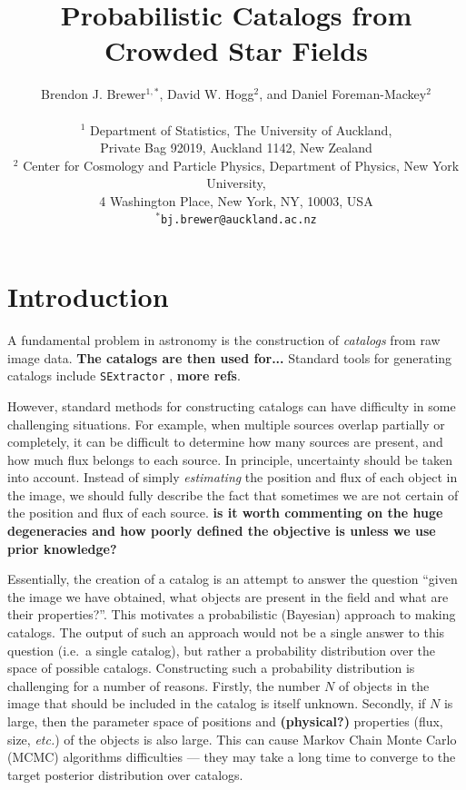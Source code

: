 \documentclass[letterpaper, 11pt]{article}
\title{Probabilistic Catalogs from Crowded Star Fields}
\author{Brendon J. Brewer$^{1,*}$, David W. Hogg$^{2}$,
and Daniel Foreman-Mackey$^{2}$ \\
\\
\small
$^1$ Department of Statistics, The University of Auckland,\\
\small
Private Bag 92019, Auckland 1142, New Zealand \\
\small
$^2$ Center for Cosmology and Particle Physics, Department of Physics,
New York University,\\
\small
4 Washington Place, New York, NY, 10003, USA\\
\small
$^*$\texttt{bj.brewer@auckland.ac.nz}
}
\newcommand{\etc}{\emph{etc.}}
\begin{document}
\maketitle


\section{Introduction}
A fundamental problem in astronomy is the construction of {\it catalogs} from
raw image data. {\bf The catalogs are then used for...}
Standard tools for generating catalogs include \texttt{SExtractor}
\citep{sextractor}, {\bf more refs}.

However, standard methods for constructing catalogs can have difficulty in some
challenging situations. For example, when multiple sources overlap partially
or completely, it can be difficult to determine how many sources are present,
and how much flux belongs to each source. In principle, uncertainty should be
taken into account. Instead of simply {\it estimating} the position and flux of
each object in the image, we should fully describe the fact that sometimes we
are not certain of the position and flux of each source. {\bf is it worth
commenting on the huge degeneracies and how poorly defined the objective is
unless we use prior knowledge?}

Essentially, the creation of a catalog is an attempt to answer the question
``given the image we have obtained, what objects are present in the field and
what are their properties?''. This motivates a probabilistic (Bayesian)
approach to making catalogs. The output of such an approach would not be a
single answer to this question (i.e.~a single catalog), but rather a
probability distribution over the space of possible catalogs.
Constructing such a probability distribution is
challenging for a number of reasons. Firstly, the number $N$ of objects in the
image that should be included in the catalog is itself unknown. Secondly, if
$N$ is large, then the parameter space
of positions and {\bf (physical?)} properties (flux, size, \etc) of the
objects is also large.
This can cause Markov Chain Monte Carlo (MCMC) algorithms difficulties --- they
may take a long time to converge to the target posterior distribution over
catalogs.
\end{document}
